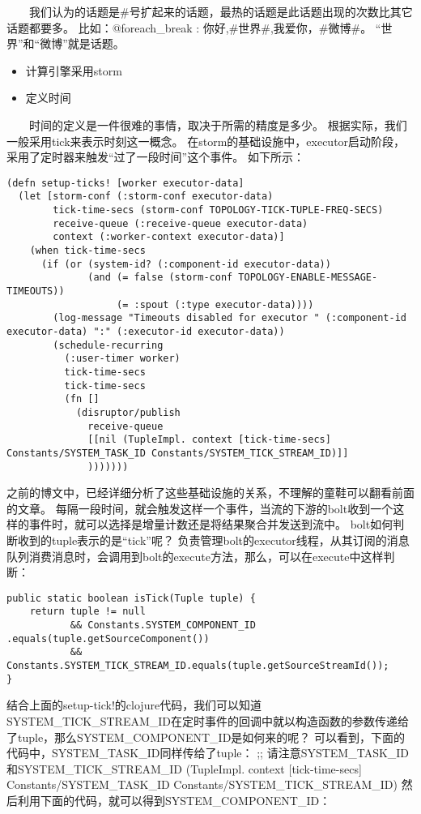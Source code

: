   我们认为的话题是\#号扩起来的话题，最热的话题是此话题出现的次数比其它话题都要多。
比如：@foreach\_break : 你好,\#世界\#,我爱你，\#微博\#。
``世界''和``微博''就是话题。

\begin{itemize}
\item
  计算引擎采用storm
\item
  定义时间
\end{itemize}

  时间的定义是一件很难的事情，取决于所需的精度是多少。
根据实际，我们一般采用tick来表示时刻这一概念。
在storm的基础设施中，executor启动阶段，采用了定时器来触发``过了一段时间''这个事件。
如下所示：

\begin{verbatim}
(defn setup-ticks! [worker executor-data]
  (let [storm-conf (:storm-conf executor-data)
        tick-time-secs (storm-conf TOPOLOGY-TICK-TUPLE-FREQ-SECS)
        receive-queue (:receive-queue executor-data)
        context (:worker-context executor-data)]
    (when tick-time-secs
      (if (or (system-id? (:component-id executor-data))
              (and (= false (storm-conf TOPOLOGY-ENABLE-MESSAGE-TIMEOUTS))
                   (= :spout (:type executor-data))))
        (log-message "Timeouts disabled for executor " (:component-id executor-data) ":" (:executor-id executor-data))
        (schedule-recurring
          (:user-timer worker)
          tick-time-secs
          tick-time-secs
          (fn []
            (disruptor/publish
              receive-queue
              [[nil (TupleImpl. context [tick-time-secs] Constants/SYSTEM_TASK_ID Constants/SYSTEM_TICK_STREAM_ID)]]
              )))))))
\end{verbatim}

之前的博文中，已经详细分析了这些基础设施的关系，不理解的童鞋可以翻看前面的文章。
每隔一段时间，就会触发这样一个事件，当流的下游的bolt收到一个这样的事件时，就可以选择是增量计数还是将结果聚合并发送到流中。
bolt如何判断收到的tuple表示的是``tick''呢？
负责管理bolt的executor线程，从其订阅的消息队列消费消息时，会调用到bolt的execute方法，那么，可以在execute中这样判断：

\begin{verbatim}
public static boolean isTick(Tuple tuple) {
    return tuple != null
           && Constants.SYSTEM_COMPONENT_ID  .equals(tuple.getSourceComponent())
           && Constants.SYSTEM_TICK_STREAM_ID.equals(tuple.getSourceStreamId());
}
\end{verbatim}

结合上面的setup-tick!的clojure代码，我们可以知道SYSTEM\_TICK\_STREAM\_ID在定时事件的回调中就以构造函数的参数传递给了tuple，那么SYSTEM\_COMPONENT\_ID是如何来的呢？
可以看到，下面的代码中，SYSTEM\_TASK\_ID同样传给了tuple： ;;
请注意SYSTEM\_TASK\_ID和SYSTEM\_TICK\_STREAM\_ID (TupleImpl. context
{[}tick-time-secs{]} Constants/SYSTEM\_TASK\_ID
Constants/SYSTEM\_TICK\_STREAM\_ID)
然后利用下面的代码，就可以得到SYSTEM\_COMPONENT\_ID：


